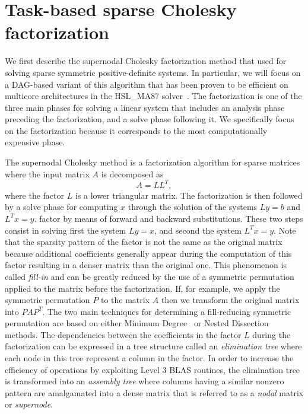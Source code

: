 \documentclass{article}
\newcommand{\ma}{HSL\_MA87\xspace}
\newcommand{\lsection}[1]{\section{#1} \setcounter{equation}{0} \setcounter{figure}{0} \setcounter{table}{0} \label{#1}}
\begin{document}


\lsection{Task-based sparse Cholesky factorization}\label{sec:chol}
\setcounter{equation}{0}
\setcounter{table}{0}
\setcounter{figure}{0}

We first describe the supernodal Cholesky factorization method that
used for solving sparse symmetric positive-definite systems. In
particular, we will focus on a DAG-based variant of this algorithm that
has been proven to be efficient on multicore architectures
in the \ma solver~\cite{h.r.s:10}. The factorization
is one of the three main phases for solving a linear system that
includes an analysis phase preceding the factorization, and a solve
phase following it. We specifically focus on the factorization because
it corresponds to the most computationally expensive phase.

The supernodal Cholesky method is a factorization algorithm for sparse
matrices where the input matrix $A$ is decomposed as
\begin{equation}\label{eq:chol}
  A = LL^{T},
\end{equation}
where the factor $L$ is a lower triangular matrix. The factorization
is then followed by a solve phase for computing $x$ through the solution
of the systems $Ly=b$ and $L^Tx=y$.
factor by means of forward and backward substitutions. These two steps
consist in solving first the system $Ly=x$, and second the system
$L^{T}x=y$. Note that the sparsity pattern of the factor is not the
same as the original matrix because additional coefficients
generally appear during the computation of this factor resulting in a
denser matrix than the original one. This phenomenon is called
\textit{fill-in} and can be greatly reduced by the use of a symmetric
permutation applied to the matrix before the factorization. If, for
example, we apply the symmetric permutation $P$ to the matrix $A$ then
we transform the original matrix into $PAP^{T}$. The two main
techniques for determining a fill-reducing symmetric permutation are
based on either Minimum Degree~\cite{t.w:67, l:85, a.d.d:96, a.d.d:04}
or Nested Dissection~\cite{g.l:78} methods. The dependencies between
the coefficients in the factor $L$ during the factorization can be
expressed in a tree structure called an \textit{elimination tree}
where each node in this tree represent a column in the factor. In
order to increase the efficiency of operations by exploiting Level 3
BLAS routines, the elimination tree is transformed into an
\textit{assembly tree} where columns having a similar nonzero pattern
are amalgamated into a dense matrix that is referred to as a
\textit{nodal} matrix or \textit{supernode}. 
\end{document}
